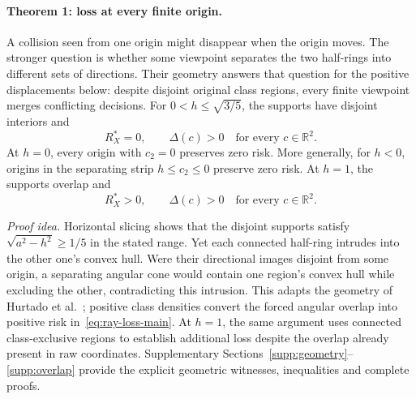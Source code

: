\paragraph{Theorem 1: loss at every finite origin.}
A collision seen from one origin might disappear when the origin moves. The stronger question is whether some viewpoint separates the two half-rings into different sets of directions. Their geometry answers that question for the positive displacements below: despite disjoint original class regions, every finite viewpoint merges conflicting decisions. For $0<h\leq\sqrt{3/5}$, the supports have disjoint interiors and
\begin{equation}
 R_X^*=0,\qquad \Delta(c)>0
 \quad\text{for every }c\in\mathbb R^2.
 \label{eq:all-origin-disjoint}
\end{equation}
At $h=0$, every origin with $c_2=0$ preserves zero risk. More generally, for $h<0$, origins in the separating strip $h\leq c_2\leq0$ preserve zero risk. At $h=1$, the supports overlap and
\begin{equation}
 R_X^*>0,\qquad \Delta(c)>0
 \quad\text{for every }c\in\mathbb R^2.
 \label{eq:all-origin-overlap}
\end{equation}

\emph{Proof idea.}
Horizontal slicing shows that the disjoint supports satisfy $\sqrt{a^2-h^2}\geq1/5$ in the stated range. Yet each connected half-ring intrudes into the other one's convex hull. Were their directional images disjoint from some origin, a separating angular cone would contain one region's convex hull while excluding the other, contradicting this intrusion. This adapts the geometry of Hurtado et al.~\citep{Hurtado2001}; positive class densities convert the forced angular overlap into positive risk in~\eqref{eq:ray-loss-main}. At $h=1$, the same argument uses connected class-exclusive regions to establish additional loss despite the overlap already present in raw coordinates. Supplementary Sections~\ref{supp:geometry}--\ref{supp:overlap} provide the explicit geometric witnesses, inequalities and complete proofs.

